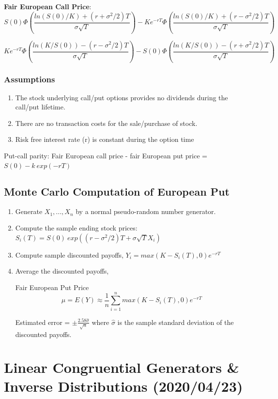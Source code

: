 \documentclass[11pt]{article}
\begin{document}
\textbf{Fair European Call Price}:
$$
S(0) \Phi(\frac{ln(S(0)/K) + (r + \sigma^2/2)T}{\sigma \sqrt{T}}) - Ke^{-rT}
\Phi(\frac{ln(S(0)/K) + (r - \sigma^2/2)T}{\sigma \sqrt{T}})
$$

$$
Ke^{-rT} \Phi(\frac{ln(K/S(0)) - (r - \sigma^2/2)T}{\sigma \sqrt{T}}) - S(0) \Phi(\frac{ln(K/S(0)) - (r + \sigma^2/2)T}{\sigma \sqrt{T}})
$$

\subsubsection{Assumptions}
\label{sec:orgb3a621c}
\begin{enumerate}
\item The stock underlying call/put options provides no dividends during the
call/put lifetime.
\item There are no transaction costs for the sale/purchase of stock.
\item Risk free interest rate (r) is constant during the option time
\end{enumerate}

Put-call parity: Fair European call price - fair European put price = \(S(0) - k
\ exp(-rT)\)

\subsection{Monte Carlo Computation of European Put}
\label{sec:org6332563}

\begin{enumerate}
\item Generate \(X_1, ..., X_n\) by a normal pseudo-random number generator.
\item Compute the sample ending stock prices: \(S_i(T) = S(0) \ exp((r -
   \sigma^2/2)T + \sigma \sqrt{T} X_i)\)
\item Compute sample discounted payoffs, \(Y_i = max(K - S_i(T), 0) e^{-r T}\)
\item Average the discounted payoffs,

Fair European Put Price
$$
   \mu = E(Y) \approx \frac{1}{n} \sum_{i = 1}^{n} max(K - S_i(T), 0) e^{-r T}
   $$

Estimated error = \(\pm \frac{2.58 \hat \sigma}{\sqrt{n}}\) where \(\hat \sigma\)
is the sample standard deviation of the discounted payoffs.
\end{enumerate}
\section{Linear Congruential Generators \& Inverse Distributions (2020/04/23)}
\label{sec:org4f628cd}
\end{document}
